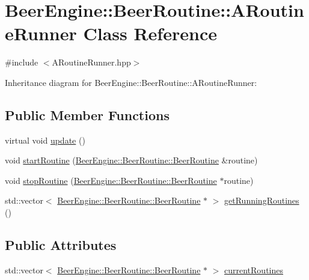 \hypertarget{class_beer_engine_1_1_beer_routine_1_1_a_routine_runner}{}\section{Beer\+Engine\+:\+:Beer\+Routine\+:\+:A\+Routine\+Runner Class Reference}
\label{class_beer_engine_1_1_beer_routine_1_1_a_routine_runner}


{\ttfamily \#include $<$A\+Routine\+Runner.\+hpp$>$}



Inheritance diagram for Beer\+Engine\+:\+:Beer\+Routine\+:\+:A\+Routine\+Runner\+:
\subsection*{Public Member Functions}
\begin{DoxyCompactItemize}
\item 
virtual void \mbox{\hyperlink{class_beer_engine_1_1_beer_routine_1_1_a_routine_runner_a7a5253cb3a64dcb1aa66806fe7c12f62}{update}} ()
\item 
void \mbox{\hyperlink{class_beer_engine_1_1_beer_routine_1_1_a_routine_runner_a39c1caf6c18c8f6e2821dc490226279f}{start\+Routine}} (\mbox{\hyperlink{class_beer_engine_1_1_beer_routine_1_1_beer_routine}{Beer\+Engine\+::\+Beer\+Routine\+::\+Beer\+Routine}} \&routine)
\item 
void \mbox{\hyperlink{class_beer_engine_1_1_beer_routine_1_1_a_routine_runner_a3c4bff92fb1bad462946a3b48e62a44e}{stop\+Routine}} (\mbox{\hyperlink{class_beer_engine_1_1_beer_routine_1_1_beer_routine}{Beer\+Engine\+::\+Beer\+Routine\+::\+Beer\+Routine}} $\ast$routine)
\item 
std\+::vector$<$ \mbox{\hyperlink{class_beer_engine_1_1_beer_routine_1_1_beer_routine}{Beer\+Engine\+::\+Beer\+Routine\+::\+Beer\+Routine}} $\ast$ $>$ \mbox{\hyperlink{class_beer_engine_1_1_beer_routine_1_1_a_routine_runner_a6f8c4cb25ea70365de58a6dfba860d96}{get\+Running\+Routines}} ()
\end{DoxyCompactItemize}
\subsection*{Public Attributes}
\begin{DoxyCompactItemize}
\item 
std\+::vector$<$ \mbox{\hyperlink{class_beer_engine_1_1_beer_routine_1_1_beer_routine}{Beer\+Engine\+::\+Beer\+Routine\+::\+Beer\+Routine}} $\ast$ $>$ \mbox{\hyperlink{class_beer_engine_1_1_beer_routine_1_1_a_routine_runner_a529596ac2d47cd5a2efb58f93fb40ff4}{current\+Routines}}
\end{DoxyCompactItemize}


